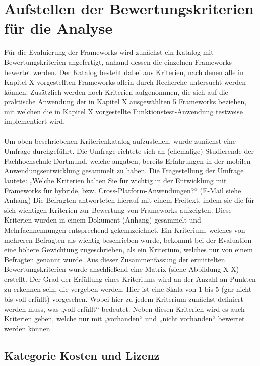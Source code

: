 \chapter{Aufstellen der Bewertungskriterien für die Analyse}

Für die Evaluierung der Frameworks wird zunächst ein Katalog mit Bewertungskriterien angefertigt, anhand dessen die einzelnen Frameworks bewertet werden. Der Katalog besteht dabei aus Kriterien, nach denen alle in Kapitel X vorgestellten Frameworks allein durch Recherche untersucht werden können. Zusätzlich werden noch Kriterien aufgenommen, die sich auf die praktische Anwendung der in Kapitel X ausgewählten 5 Frameworks beziehen, mit welchen die in Kapitel X vorgestellte Funktionstest-Anwendung testweise implementiert wird. 
\\
\\
Um oben beschriebenen Kriterienkatalog aufzustellen, wurde zunächst eine Umfrage durchgeführt. Die Umfrage richtete sich an (ehemalige) Studierende der Fachhochschule Dortmund, welche angaben, bereits Erfahrungen in der mobilen Anwendungsentwicklung gesammelt zu haben. Die Fragestellung der Umfrage lautete: „Welche Kriterien halten Sie für wichtig in der Entwicklung mit Frameworks für hybride, bzw. Cross-Platform-Anwendungen?“ (E-Mail siehe Anhang) Die Befragten antworteten hierauf mit einem Freitext, indem sie die für sich wichtigen Kriterien zur Bewertung von Frameworks aufzeigten. Diese Kriterien wurden in einem Dokument (Anhang) gesammelt und Mehrfachnennungen entsprechend gekennzeichnet. Ein Kriterium, welches von mehreren Befragten als wichtig beschrieben wurde, bekommt bei der Evaluation eine höhere Gewichtung zugeschrieben, als ein Kriterium, welches nur von einem Befragten genannt wurde. Aus dieser Zusammenfassung der ermittelten Bewertungskriterien wurde anschließend eine Matrix (siehe Abbildung X-X) erstellt. Der Grad der Erfüllung eines Kriteriums wird an der Anzahl an Punkten zu erkennen sein, die vergeben werden. Hier ist eine Skala von 1 bis 5 (gar nicht bis voll erfüllt) vorgesehen. Wobei hier zu jedem Kriterium zunächst definiert werden muss, was „voll erfüllt“ bedeutet. Neben diesen Kriterien wird es auch Kriterien geben, welche nur mit „vorhanden“ und „nicht vorhanden“ bewertet werden können.

\section{Kategorie Kosten und Lizenz} 

